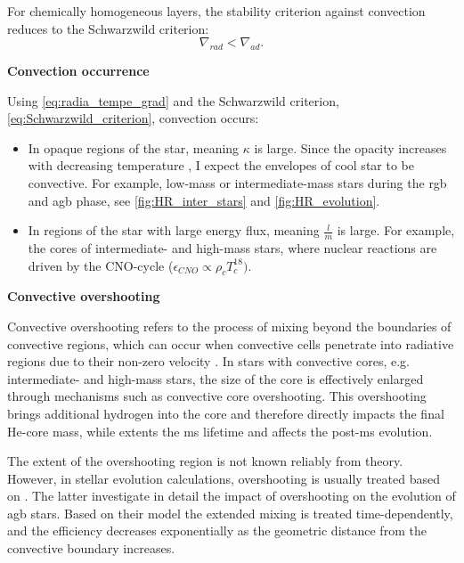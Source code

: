 For chemically homogeneous layers, the stability criterion against convection reduces to the Schwarzwild criterion:
\begin{equation}\label{eq:Schwarzwild_criterion}
    \nabla_{rad} < \nabla_{ad}.
\end{equation}
 

{\bf Convection occurrence}

Using \cref{eq:radia_tempe_grad} and the Schwarzwild criterion, \cref{eq:Schwarzwild_criterion}, convection occurs:
\begin{itemize}
    \item In opaque regions of the star, meaning $\kappa$ is large. Since the opacity increases with decreasing temperature \citep{pols2011stellar}, I expect the envelopes of cool star to be convective. For example, low-mass or intermediate-mass stars during the \ac{rgb} and \ac{agb} phase, see \cref{fig:HR_inter_stars} and \cref{fig:HR_evolution}.
    \item In regions of the star with large energy flux, meaning $\frac{l}{m}$ is large. For example, the cores of intermediate- and high-mass stars, where nuclear reactions are driven by the CNO-cycle ($\epsilon_{CNO} \propto \rho_c T_{c}^{18})$.
\end{itemize}

{\bf Convective overshooting}

Convective overshooting refers to the process of mixing beyond the boundaries of convective regions, which can occur when convective cells penetrate into radiative regions due to their non-zero velocity \citep{alongi1993evolutionary,brott2011rotating,schootemeijer2019constraining}. In stars with convective cores, e.g. intermediate- and high-mass stars, the size of the core is effectively enlarged through mechanisms such as convective core overshooting. This overshooting brings additional hydrogen into the core and therefore directly impacts the final He-core mass, while extents the \ac{ms} lifetime and affects the post-\ac{ms} evolution.

The extent of the overshooting region is not known reliably from theory. However, in stellar evolution calculations, overshooting is usually treated based on \cite{herwig2000evolution}. The latter investigate in detail the impact of overshooting on the evolution of \ac{agb} stars. Based on their model the extended mixing is treated time-dependently, and the efficiency decreases exponentially as the geometric distance from the convective boundary increases. 

